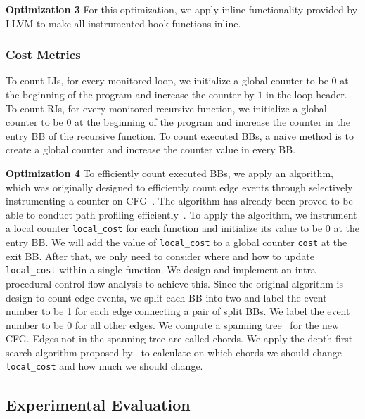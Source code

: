 \textbf{Optimization 3}
For this optimization, we apply inline functionality 
provided by LLVM to make all instrumented hook functions inline.

\subsubsection{Cost Metrics}
To count LIs, for every monitored loop, we initialize 
a global counter to be $0$ at the beginning of the program and 
increase the counter by $1$ in the loop header.
To count RIs, for every monitored recursive function, 
we initialize a global counter to be $0$ at the beginning of the program
and increase the counter 
in the entry BB of the recursive function. 
To count executed BBs, a naive method is to create a global counter
and increase the counter value in every BB. 


\textbf{Optimization 4}
To efficiently count executed BBs, 
we apply an algorithm, which was originally designed to 
efficiently count edge events through selectively instrumenting a counter 
on CFG~\cite{event-counting}.
The algorithm has already been proved to be able to 
conduct path profiling efficiently~\cite{peter-ase,path-profiling}. 
To apply the algorithm,
we instrument a local counter \texttt{local\_cost} for each function
and initialize its value to be $0$ at the entry BB. 
We will add the value of \texttt{local\_cost} to a global counter \texttt{cost} 
at the exit BB.
After that, we only need to consider where 
and how to update \texttt{local\_cost} 
within a single function.
We design and implement an intra-procedural control flow analysis
to achieve this.
Since the original algorithm is design to count edge events,
we split each BB into two 
and label the event number to be 1 for each edge connecting a pair of split BBs. 
We label the event number to be 0 for all other edges.
We compute a spanning tree~\cite{spanning} for the new CFG.
Edges not in the spanning tree are called chords.
We apply the depth-first search algorithm proposed by~\citet{event-counting} 
to calculate on which chords we should change 
\texttt{local\_cost} 
and how much we should change.

\subsection{Experimental Evaluation}
\label{sec:inhouse_exp}

